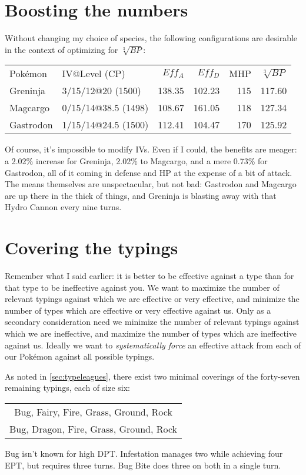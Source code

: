 \section{Boosting the numbers}
Without changing my choice of species, the following configurations are desirable
  in the context of optimizing for $\sqrt[3]{BP}$:
\begin{center}
  \begin{tabular}{llrrrr}
    Pokémon & IV@Level (CP) & $Eff_A$ & $Eff_D$ & MHP & $\sqrt[3]{BP}$\\
    \Midrule
    Greninja & 3/15/12@20 (1500) & 138.35 & 102.23 & 115 & 117.60\\
    Magcargo & 0/15/14@38.5 (1498) & 108.67 & 161.05 & 118 & 127.34\\
    Gastrodon & 1/15/14@24.5 (1500) & 112.41 & 104.47 & 170 & 125.92\\
  \end{tabular}
\end{center}
Of course, it's impossible to modify IVs.
Even if I could, the benefits are meager: a 2.02\% increase for Greninja,
  2.02\% to Magcargo, and a mere 0.73\% for Gastrodon, all of it coming
  in defense and HP at the expense of a bit of attack.
The means themselves are unspectacular, but not bad: Gastrodon and Magcargo are up there
  in the thick of things, and Greninja is blasting away with that Hydro Cannon every nine turns.

\section{Covering the typings}
Remember what I said earlier: it is better to be effective against a type than for that
  type to be ineffective against you.
We want to maximize the number of relevant typings against which we are effective or
  very effective, and minimize the number of types which are effective or very effective against us.
Only as a secondary consideration need we minimize the number of relevant
  typings against which we are ineffective, and maximize the number of types
  which are ineffective against us.
Ideally we want to \textit{systematically force} an effective attack from each
  of our Pokémon against all possible typings.

As noted in \autoref{sec:typeleagues}, there exist two minimal coverings of the forty-seven
  remaining typings, each of size six:
\begin{center}
\begin{tabular}{c}
 Bug, Fairy, Fire, Grass, Ground, Rock\\
 Bug, Dragon, Fire, Grass, Ground, Rock\\
\end{tabular}
\end{center}
Bug isn't known for high DPT\@. Infestation manages two while achieving four EPT,
 but requires three turns. Bug Bite does three on both in a single turn.

